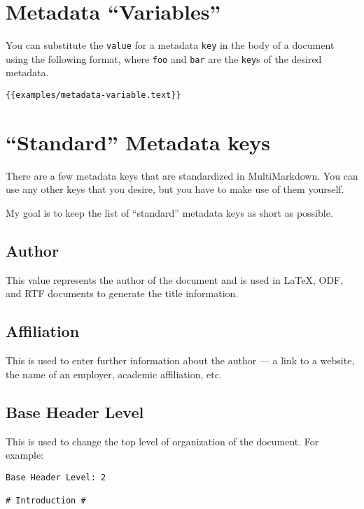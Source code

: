 \section{Metadata ``Variables'' }
\label{metadatavariables}

You can substitute the \texttt{value} for a metadata \texttt{key} in the body of a document using the following format, where \texttt{foo} and \texttt{bar} are the \texttt{key}s of the desired metadata.

\begin{verbatim}
{{examples/metadata-variable.text}}
\end{verbatim}

\section{``Standard'' Metadata keys }
\label{standardmetadatakeys}

There are a few metadata keys that are standardized in MultiMarkdown. You can
use any other keys that you desire, but you have to make use of them yourself.

My goal is to keep the list of ``standard'' metadata keys as short as possible.

\subsection{Author }
\label{author}

This value represents the author of the document and is used in LaTeX, ODF, and RTF
documents to generate the title information.

\subsection{Affiliation }
\label{affiliation}

This is used to enter further information about the author --- a link to a
website, the name of an employer, academic affiliation, etc.

\subsection{Base Header Level }
\label{baseheaderlevel}

This is used to change the top level of organization of the document. For example:

\begin{verbatim}
Base Header Level: 2

# Introduction #
\end{verbatim}

